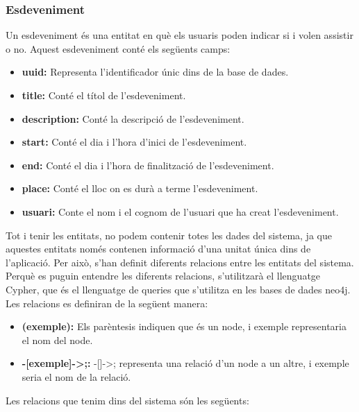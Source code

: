 \documentclass[11pt,catalan,listoffigures,listoftables]{tfgetsinf}
\begin{document}
\subsubsection{Esdeveniment}
Un esdeveniment és una entitat en què els usuaris poden indicar si i volen assistir o no. Aquest esdeveniment conté els següents camps:
\begin{itemize}
\item \textbf{uuid:} Representa l'identificador únic dins de la base de dades.
\item \textbf{title:} Conté el títol de l'esdeveniment.
\item \textbf{description:} Conté la descripció de l'esdeveniment.
\item \textbf{start:} Conté el dia i l'hora d'inici de l'esdeveniment.
\item \textbf{end:} Conté el dia i l'hora de finalització de l'esdeveniment.
\item \textbf{place:} Conté el lloc on es durà a terme l'esdeveniment.
\item \textbf{usuari:} Conte el nom i el cognom de l'usuari que ha creat l'esdeveniment.
\end{itemize}
Tot i tenir les entitats, no podem contenir totes les dades del sistema, ja que aquestes entitats només contenen informació d'una unitat única dins de l'aplicació. Per això, s'han definit diferents relacions entre les entitats del sistema. Perquè es puguin entendre les diferents relacions, s'utilitzarà el llenguatge Cypher, que és el llenguatge de queries que s'utilitza en les bases de dades neo4j. Les relacions es definiran de la següent manera:
\begin{itemize}
\item \textbf{(exemple):} Els parèntesis indiquen que és un node, i exemple representaria el nom del node.
\item \textbf{-[exemple]->;:} -[]->; representa una relació d'un node a un altre, i exemple seria el nom de la relació.
\end{itemize}
Les relacions que tenim dins del sistema són les següents:
\end{document}
